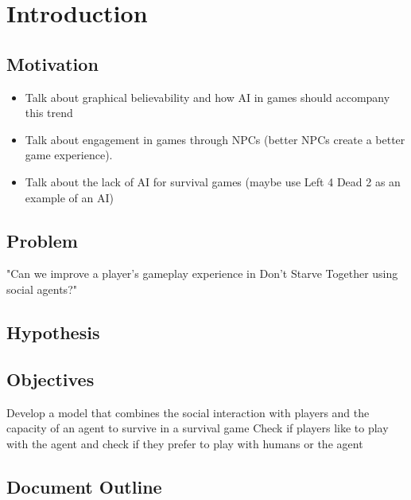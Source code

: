 \section{Introduction}

\subsection{Motivation}

\begin{itemize}
	\item Talk about graphical believability and how AI in games should accompany this trend
	\item Talk about engagement in games through NPCs (better NPCs create a better game experience).
	\item Talk about the lack of AI for survival games (maybe use Left 4 Dead 2 as an example of an AI)
\end{itemize}

\subsection{Problem}
"Can we improve a player's gameplay experience in Don't Starve Together using social agents?"

\subsection{Hypothesis}


\subsection{Objectives}
Develop a model that combines the social interaction with players and the capacity of an agent to survive in a survival game
Check if players like to play with the agent
and check if they prefer to play with humans or the agent

\subsection{Document Outline}